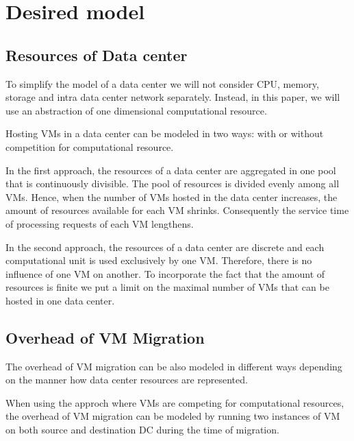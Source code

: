 \section{Desired model}

\subsection{Resources of Data center}
To simplify the model of a data center we will not consider CPU, memory, storage and intra data center network separately.
Instead, in this paper, we will use an abstraction of one dimensional computational resource.

Hosting VMs in a data center can be modeled in two ways: with or without competition for computational resource.

In the first approach, the resources of a data center are aggregated in one pool that is continuously divisible.
The pool of resources is divided evenly among all VMs.
Hence, when the number of VMs hosted in the data center increases, the amount of resources available for each VM shrinks.
Consequently the service time of processing requests of each VM lengthens.

In the second approach, the resources of a data center are discrete and each computational unit is used exclusively by one VM.
Therefore, there is no influence of one VM on another.
To incorporate the fact that the amount of resources is finite we put a limit on the maximal number of VMs that can be hosted in one data center.

\subsection{Overhead of VM Migration}
The overhead of VM migration can be also modeled in different ways depending on the manner how data center resources are represented.

When using the approch where VMs are competing for computational resources, the overhead of VM migration can be modeled by running two instances of VM on both source and destination DC during the time of migration. 

